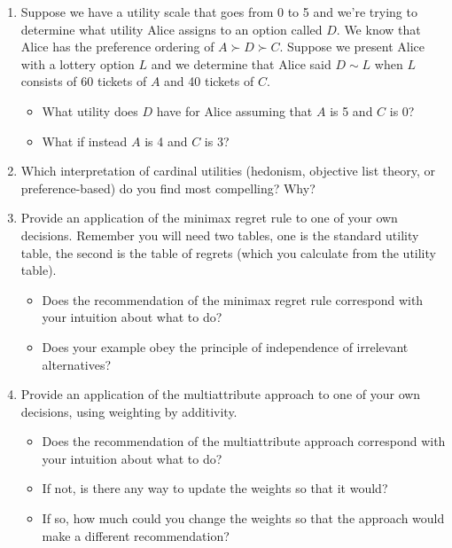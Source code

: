 \documentclass[]{tufte-book}
\providecommand{\tightlist}{%
  \setlength{\itemsep}{0pt}\setlength{\parskip}{0pt}}
\begin{document}
\begin{enumerate}
\def\labelenumi{\arabic{enumi}.}
\item
  Suppose we have a utility scale that goes from 0 to 5 and we're trying to determine what utility Alice assigns to an option called \(D\). We know that Alice has the preference ordering of \(A\succ D \succ C\). Suppose we present Alice with a lottery option \(L\) and we determine that Alice said \(D \sim L\) when \(L\) consists of 60 tickets of \(A\) and 40 tickets of \(C\).

  \begin{itemize}
  \tightlist
  \item
    What utility does \(D\) have for Alice assuming that \(A\) is 5 and \(C\) is 0?
  \item
    What if instead \(A\) is 4 and \(C\) is 3?
  \end{itemize}
\item
  Which interpretation of cardinal utilities (hedonism, objective list theory, or preference-based) do you find most compelling? Why?
\item
  Provide an application of the minimax regret rule to one of your own decisions. Remember you will need two tables, one is the standard utility table, the second is the table of regrets (which you calculate from the utility table).

  \begin{itemize}
  \tightlist
  \item
    Does the recommendation of the minimax regret rule correspond with your intuition about what to do?
  \item
    Does your example obey the principle of independence of irrelevant alternatives?
  \end{itemize}
\item
  Provide an application of the multiattribute approach to one of your own decisions, using weighting by additivity.

  \begin{itemize}
  \tightlist
  \item
    Does the recommendation of the multiattribute approach correspond with your intuition about what to do?
  \item
    If not, is there any way to update the weights so that it would?
  \item
    If so, how much could you change the weights so that the approach would make a different recommendation?
  \end{itemize}
\end{enumerate}
\end{document}
